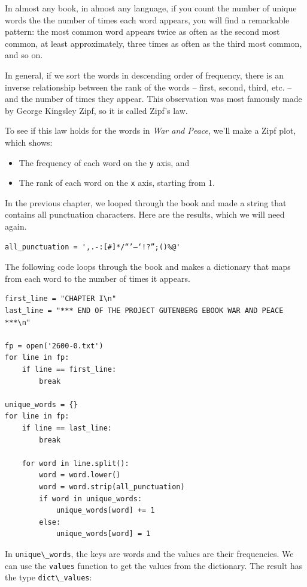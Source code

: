 In almost any book, in almost any language, if you count the number of
unique words the the number of times each word appears, you will find a
remarkable pattern: the most common word appears twice as often as the
second most common, at least approximately, three times as often as the
third most common, and so on.

In general, if we sort the words in descending order of frequency, there
is an inverse relationship between the rank of the words -- first,
second, third, etc. -- and the number of times they appear. This
observation was most famously made by George Kingsley Zipf, so it is
called Zipf's law.

To see if this law holds for the words in \emph{War and Peace}, we'll
make a Zipf plot, which shows:

\begin{itemize}
\item
  The frequency of each word on the \passthrough{\lstinline!y!} axis,
  and
\item
  The rank of each word on the \passthrough{\lstinline!x!} axis,
  starting from 1.
\end{itemize}

In the previous chapter, we looped through the book and made a string
that contains all punctuation characters. Here are the results, which we
will need again.

\begin{lstlisting}[]
all_punctuation = ',.-:[#]*/“’—‘!?”;()%@'
\end{lstlisting}

The following code loops through the book and makes a dictionary that
maps from each word to the number of times it appears.

\begin{lstlisting}[]
first_line = "CHAPTER I\n"
last_line = "*** END OF THE PROJECT GUTENBERG EBOOK WAR AND PEACE ***\n"

fp = open('2600-0.txt')
for line in fp:
    if line == first_line:
        break

unique_words = {}
for line in fp:
    if line == last_line:
        break
        
    for word in line.split():
        word = word.lower()
        word = word.strip(all_punctuation)
        if word in unique_words:
            unique_words[word] += 1
        else:
            unique_words[word] = 1
\end{lstlisting}

In \passthrough{\lstinline!unique\_words!}, the keys are words and the
values are their frequencies. We can use the
\passthrough{\lstinline!values!} function to get the values from the
dictionary. The result has the type
\passthrough{\lstinline!dict\_values!}:


